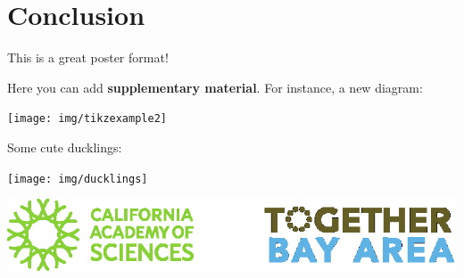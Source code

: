 \documentclass[a0paper,fleqn]{betterposter}
\begin{document}
{\section{Conclusion}
This is a great poster format!

\vfill



}{

Here you can add \textbf{supplementary material}. For instance, a new diagram:
\begin{center}
\texttt{[image: img/tikzexample2]}
\end{center}

Some cute ducklings:
\begin{center}
\texttt{[image: img/ducklings]}
\end{center}


\vfill

\begin{center}

\includegraphics[width=.8\textwidth]{img/combined_logo.eps}\\
\end{center}
}
\end{document}
